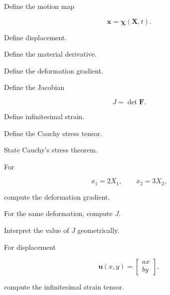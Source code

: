 \begin{exercise}[1]
Define the motion map

\[
\mathbf{x}
=
\boldsymbol{\chi}(\mathbf{X},t).
\]
\end{exercise}

\begin{exercise}[1]
Define displacement.
\end{exercise}

\begin{exercise}[1]
Define the material derivative.
\end{exercise}

\begin{exercise}[1]
Define the deformation gradient.
\end{exercise}

\begin{exercise}[1]
Define the Jacobian

\[
J=\det\mathbf{F}.
\]
\end{exercise}

\begin{exercise}[1]
Define infinitesimal strain.
\end{exercise}

\begin{exercise}[1]
Define the Cauchy stress tensor.
\end{exercise}

\begin{exercise}[1]
State Cauchy's stress theorem.
\end{exercise}

\begin{exercise}[2]
For

\[
x_1=2X_1,
\qquad
x_2=3X_2,
\]

compute the deformation gradient.
\end{exercise}

\begin{exercise}[2]
For the same deformation, compute \(J\).
\end{exercise}

\begin{exercise}[2]
Interpret the value of \(J\) geometrically.
\end{exercise}

\begin{exercise}[2]
For displacement

\[
\mathbf{u}(x,y)
=
\begin{bmatrix}
ax\\
by
\end{bmatrix},
\]

compute the infinitesimal strain tensor.
\end{exercise}

